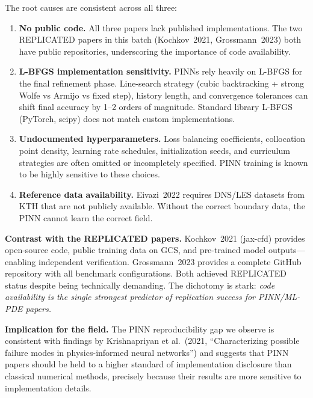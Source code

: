 The root causes are consistent across all three:
\begin{enumerate}[leftmargin=1.4em,itemsep=0.2em,topsep=0.2em]
\item \textbf{No public code.} All three papers lack published implementations.
  The two REPLICATED papers in this batch (Kochkov~2021, Grossmann~2023) both
  have public repositories, underscoring the importance of code availability.
\item \textbf{L-BFGS implementation sensitivity.} PINNs rely heavily on L-BFGS
  for the final refinement phase. Line-search strategy (cubic backtracking +
  strong Wolfe vs Armijo vs fixed step), history length, and convergence
  tolerances can shift final accuracy by 1--2 orders of magnitude. Standard
  library L-BFGS (PyTorch, scipy) does not match custom implementations.
\item \textbf{Undocumented hyperparameters.} Loss balancing coefficients,
  collocation point density, learning rate schedules, initialization seeds,
  and curriculum strategies are often omitted or incompletely specified. PINN
  training is known to be highly sensitive to these choices.
\item \textbf{Reference data availability.} Eivazi~2022 requires DNS/LES
  datasets from KTH that are not publicly available. Without the correct
  boundary data, the PINN cannot learn the correct field.
\end{enumerate}

\noindent\textbf{Contrast with the REPLICATED papers.} Kochkov~2021
(jax-cfd) provides open-source code, public training data on GCS, and
pre-trained model outputs---enabling independent verification. Grossmann~2023
provides a complete GitHub repository with all benchmark configurations.
Both achieved REPLICATED status despite being technically demanding. The
dichotomy is stark: \emph{code availability is the single strongest predictor
of replication success for PINN/ML-PDE papers.}

\noindent\textbf{Implication for the field.} The PINN reproducibility gap we
observe is consistent with findings by Krishnapriyan et al.\ (2021,
``Characterizing possible failure modes in physics-informed neural
networks'') and suggests that PINN papers should be held to a higher
standard of implementation disclosure than classical numerical methods,
precisely because their results are more sensitive to implementation
details.

